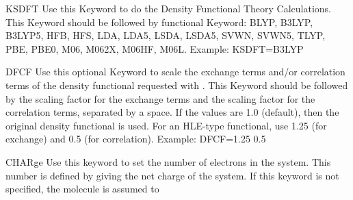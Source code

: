 \begin{keywordlist}
\item[KSDFT]
Use this Keyword to do the Density Functional Theory Calculations.
This Keyword should be followed by functional Keyword:
BLYP, B3LYP, B3LYP5, HFB, HFS, LDA, LDA5, LSDA, LSDA5, SVWN, SVWN5, TLYP, PBE, PBE0, M06, M062X, M06HF, M06L.
Example: KSDFT=B3LYP
\item[DFCF]
Use this optional Keyword to scale the exchange terms and/or correlation terms of the density functional requested with .
This Keyword should be followed by the scaling factor for the exchange terms and the scaling factor for the correlation terms, separated by a space.
If the values are 1.0 (default), then the original density functional is used.
For an HLE-type functional, use 1.25 (for exchange) and 0.5 (for correlation).
Example: DFCF=1.25 0.5
\item[CHARge]
Use this keyword to set the number of electrons in the system.
This number is defined by giving the net charge of the system.
If this keyword is not specified, the molecule is assumed to

\end{keywordlist}
